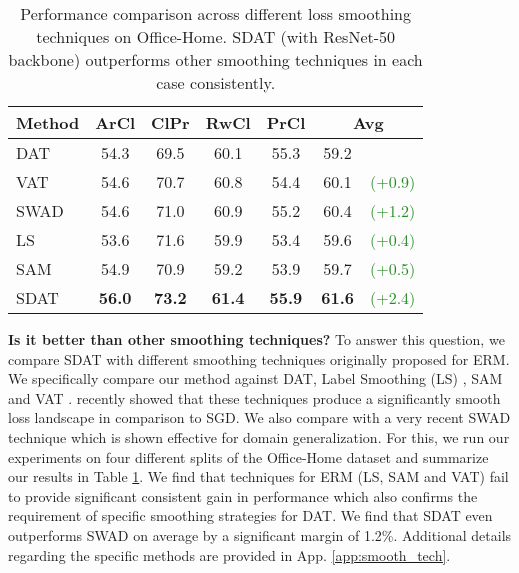 \documentclass[table,dvipsnames]{article}
\theoremstyle{plain}
\theoremstyle{definition}
\theoremstyle{remark}
\begin{document}
\begin{table}
\caption{Performance comparison across different loss smoothing techniques on Office-Home. SDAT (with ResNet-50 backbone) outperforms other smoothing techniques in each case consistently.}
\vskip 0.15in
    \begin{adjustbox}{max width=\linewidth}
    \begin{tabular}{l|cccc|cc}
    \hline
    {Method} & ArCl & ClPr & RwCl &  PrCl & \multicolumn{2}{c}{{Avg}}\\
\hline \hline
       {DAT} & 54.3 & 69.5 & 60.1 & 55.3 &  59.2 &\\
         
         {VAT} & 54.6 &70.7&  60.8 & 54.4 & 60.1 &  \textcolor{ForestGreen}{(+0.9)}\\
       {SWAD} & 54.6& 71.0 & 60.9 & 55.2 & 60.4 & \textcolor{ForestGreen}{(+1.2)} \\
        {LS}  & 53.6  & 71.6 & 59.9 &  53.4 & 59.6 & \textcolor{ForestGreen}{(+0.4)}  \\
        {SAM}  & 54.9  & 70.9 & 59.2 &  53.9 & 59.7 & \textcolor{ForestGreen}{(+0.5)}  \\
        {SDAT} &\textbf{56.0}&  \textbf{73.2} & \textbf{61.4} &\textbf{55.9} & \textbf{61.6} &\textcolor{ForestGreen}{(+2.4)}
  
\end{tabular}
    \end{adjustbox}
    
    \label{tab:diff_smooth}
\end{table}

\textbf{Is it better than other smoothing techniques?}
To answer this question, we compare SDAT with different smoothing techniques originally proposed for ERM. We specifically compare our method against DAT, Label Smoothing (LS) \citep{szegedy2016rethinking}, SAM \cite{foret2021sharpnessaware} and VAT \citep{miyato2019vat}. \citet{stutz2021relating} recently showed that these techniques produce a  significantly smooth loss landscape in comparison to SGD. We also compare with a very recent SWAD \citep{cha2021swad} technique which is shown effective for domain generalization. For this, we run our experiments on four different splits of the Office-Home dataset and summarize our results in Table \ref{tab:diff_smooth}. We find that techniques for ERM (LS, SAM and VAT) fail to provide significant consistent gain in performance which also confirms the requirement of specific smoothing strategies for DAT. We find that SDAT even outperforms SWAD on average by a significant margin of 1.2\%. Additional details regarding the specific methods are provided in App. \ref{app:smooth_tech}.
\end{document}
